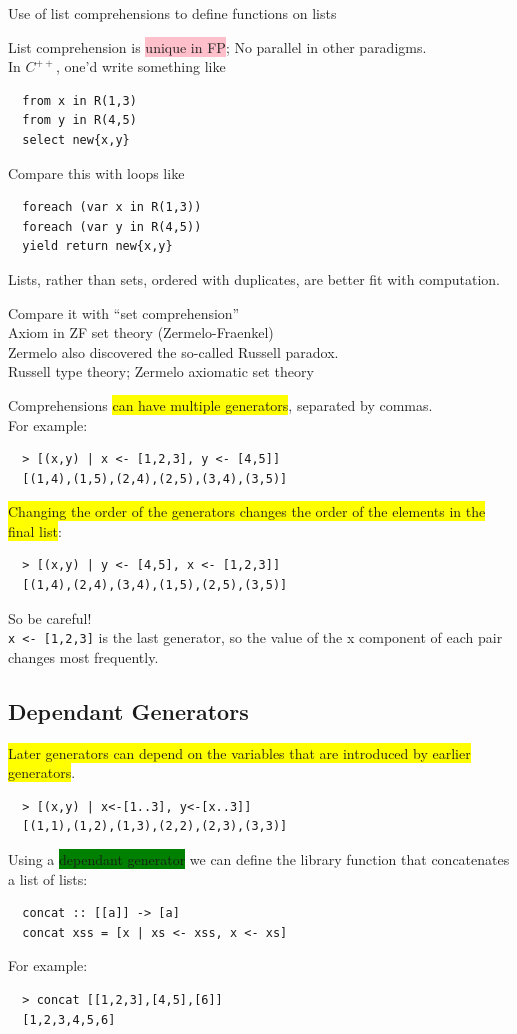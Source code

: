 \documentclass[tikz,border=10pt]{project_plan}
\begin{document}
Use of list comprehensions to define functions on lists

List comprehension is \colorbox{pink}{unique in FP}; No parallel in other paradigms.\\
In $C^{++}$, one’d write something like
\begin{lstlisting}
  from x in R(1,3)
  from y in R(4,5)
  select new{x,y}
\end{lstlisting}
Compare this with loops like
\begin{lstlisting}
  foreach (var x in R(1,3))
  foreach (var y in R(4,5))
  yield return new{x,y}
\end{lstlisting}

Lists, rather than sets, ordered with duplicates, are
better fit with computation.

Compare it with “set comprehension”\\
Axiom in ZF set theory (Zermelo-Fraenkel)\\
Zermelo also discovered the so-called Russell paradox.\\
Russell \MVRightarrow type theory; Zermelo \MVRightarrow axiomatic set theory

Comprehensions \colorbox{yellow}{can have multiple generators}, separated by commas.\\
For example:
\begin{lstlisting}
  > [(x,y) | x <- [1,2,3], y <- [4,5]]
  [(1,4),(1,5),(2,4),(2,5),(3,4),(3,5)]
 \end{lstlisting}
\colorbox{yellow}{Changing the order of the generators changes the order of the elements in the final list}:
\begin{lstlisting}
  > [(x,y) | y <- [4,5], x <- [1,2,3]]
  [(1,4),(2,4),(3,4),(1,5),(2,5),(3,5)]
\end{lstlisting}
So be careful!\\
\lstinline{x <- [1,2,3]} is the last generator, so the value of the x component of
each pair changes most frequently.

\subsection{Dependant Generators}
\colorbox{yellow}{Later generators can depend on the variables that are introduced by earlier generators}.
\begin{lstlisting}
  > [(x,y) | x<-[1..3], y<-[x..3]]
  [(1,1),(1,2),(1,3),(2,2),(2,3),(3,3)]
 \end{lstlisting}

Using a \colorbox{green}{dependant generator} we can define the library
function that concatenates a list of lists:
\begin{lstlisting}
  concat :: [[a]] -> [a]
  concat xss = [x | xs <- xss, x <- xs]
\end{lstlisting}
For example:
\begin{lstlisting}
  > concat [[1,2,3],[4,5],[6]]
  [1,2,3,4,5,6]
\end{lstlisting}
\end{document}

